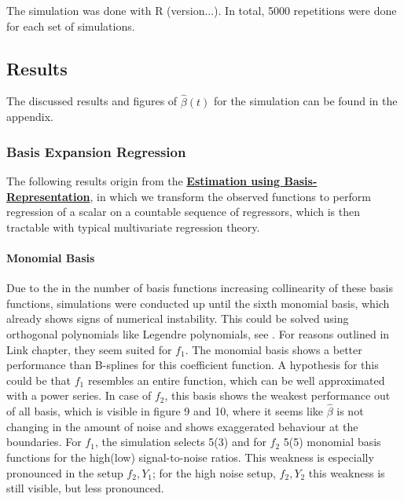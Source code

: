 \documentclass[11pt,twoside,a4paper]{article}
\begin{document}
		 The simulation was done with R (version...). In total, 5000 repetitions were done for each set of simulations. 
		
	\subsection{Results}	
	The discussed results and figures of $\hat{\beta}(t)$ for the simulation can be found in the appendix. 
	\subsubsection{Basis Expansion Regression}
	The following results origin from the \hyperref[basis_exp_transf]{\textbf{Estimation using Basis-Representation}}, in which we transform the observed functions to perform regression of a scalar on a countable sequence of regressors, which is then tractable with typical multivariate regression theory. 
	
	\paragraph{Monomial Basis}
	Due to the in the number of basis functions increasing collinearity of these basis functions, simulations were conducted up until the sixth monomial basis, which already shows signs of numerical instability. This could be solved using orthogonal polynomials like Legendre polynomials, see \cite{Dattoli_2001}. For reasons outlined in {\color{green} Link chapter}, they seem suited for $f_1$. The monomial basis shows a better performance than B-splines for this coefficient function. A hypothesis for this could be that $f_1$ resembles an entire function, which can be well approximated with a power series. In case of $f_2$, this basis shows the weakest performance out of all basis, which is visible in figure 9 and 10, where it seems like $\hat{\beta}$ is not changing in the amount of noise and shows exaggerated behaviour at the boundaries. For $f_1$, the simulation selects 5(3) and for $f_2$ 5(5) monomial basis functions for the high(low) signal-to-noise ratios. This weakness is especially pronounced in the setup $f_2,Y_1$; for the high noise setup, $f_2,Y_2$ this weakness is still visible, but less pronounced.
	
\end{document}
